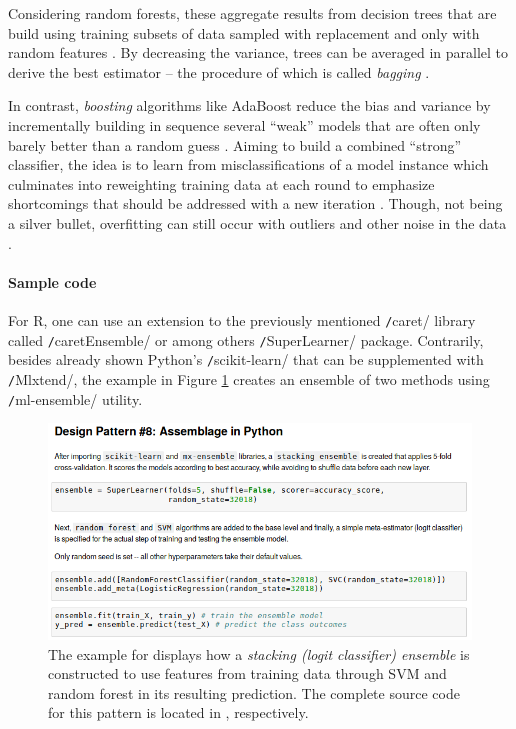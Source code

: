 Considering random forests, these aggregate results from decision trees that are build using training subsets of data sampled with replacement and only with random features \parencite{NinaBookR2014}.
By decreasing the variance, trees can be averaged in parallel to derive the best estimator -- the procedure of which is called \emph{bagging} \parencites{Opitz1999}{PeterETHZ2012}. 

In contrast, \emph{boosting} algorithms like AdaBoost reduce the bias and variance by incrementally building in sequence several \enquote{weak} models that are often only barely better than a random guess \parencite{EnsambleBioinf2010}. 
Aiming to build a combined \enquote{strong} classifier, the idea is to learn from misclassifications of a model instance which culminates into reweighting training data at each round to emphasize shortcomings that should be addressed with a new iteration \parencite{EnsembleML2012}.
Though, not being a silver bullet, overfitting can still occur with outliers and other noise in the data \parencite{BauerErikChan1999}.

\paragraph*{Sample code}
For R, one can use an extension to the previously mentioned \texttt/caret/ library called \texttt/caretEnsemble/ or among others \texttt/SuperLearner/ package. 
Contrarily, besides already shown Python's \texttt/scikit-learn/ that can be supplemented with \texttt/Mlxtend/, the example in Figure \ref{lst:code_pattern9} creates an ensemble of two methods using \texttt/ml-ensemble/ utility. 

\begin{figure}[h]
\centering
\includegraphics[width=\textwidth,height=\textheight,keepaspectratio]{images_dp/code_listing_8_ensam}
\caption[Example for Assemblage Design Pattern.]{The example for  displays how a \emph{stacking (logit classifier) ensemble} is constructed to use features from training data through \ac{SVM} and random forest in its resulting prediction.
The complete source code for this pattern is located in ,  respectively.}
\label{lst:code_pattern9}
\end{figure}


